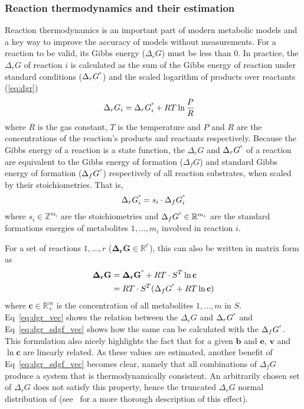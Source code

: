 \documentclass[10pt,letterpaper]{article}
\newcommand{\dgf}{\Delta_fG}
\newcommand{\sdgf}{\Delta_fG^{\degree}}
\newcommand{\dgr}{\Delta_rG}
\newcommand{\sdgr}{\Delta_rG^{\degree}}
\newcommand{\bdgr}{\mathbf{\dgr}}
\newcommand{\bsdgr}{\mathbf{\sdgr}}
\newcommand{\be}{\mathbf{e}}
\newcommand{\bb}{\mathbf{b}}
\newcommand{\bv}{\mathbf{v}}
\begin{document}
\subsubsection{Reaction thermodynamics and their estimation}
Reaction thermodynamics is an important part of modern metabolic models and a key way to improve the accuracy of models without measurements.
For a reaction to be valid, its Gibbs energy ($\dgr$) must be less than 0.
In practice, the $\dgr$ of reaction $i$ is calculated as the sum of the Gibbs energy of reaction under standard conditions ($\sdgr$) and the scaled logarithm of products over reactants (\ref{eq:dgr})
\begin{align}
    \dgr_i &= \sdgr_i + RT\ln \frac{P}{R} \label{eq:dgr}
\end{align}
where $R$ is the gas constant, $T$ is the temperature and $P$ and $R$ are the concentrations of the reaction's products and reactants respectively.
Because the Gibbs energy of a reaction is a state function, the $\dgr$ and $\sdgr$ of a reaction are equivalent to the Gibbs energy of formation ($\dgf$) and standard Gibbs energy of formation ($\sdgf$) respectively of all reaction substrates, when scaled by their stoichiometries.
That is,
\[
    \sdgr_i = s_i \cdot \sdgf_i
\]
where $s_i \in \mathbb{Z}^{m_i}$ are the stoichiometries and $\sdgf \in \mathbb{R}^{m_i}$ are the standard formations energies of metabolites $1,\dots,m_i$ involved in reaction $i$.

For a set of reactions $1,\dots,r$ ($\bdgr \in \mathbb{R^r}$), this can also be written in matrix form as
\begin{align}
        \bdgr &= \bsdgr + RT \cdot S^{T}\ln{\mathbf{c}} \label{eq:dgr_vec}\\
              &= RT \cdot S^T (\sdgf + RT \ln{\mathbf{c}}) \label{eq:dgr_sdgf_vec}
\end{align}
where $\mathbf{c} \in \mathbb{R}_{+}^m$ is the concentration of all metabolites $1,\dots,m$ in $S$.
Eq~\ref{eq:dgr_vec} shows the relation between the $\dgr$ and $\sdgr$ and Eq~\ref{eq:dgr_sdgf_vec} shows how the same can be calculated with the $\sdgf$.
This formulation also nicely highlights the fact that for a given $\bb$ and $\be$, $\bv$ and $\ln{\mathbf{c}}$ are linearly related.
As these values are estimated, another benefit of Eq~\ref{eq:dgr_sdgf_vec} becomes clear, namely that all combinations of $\dgf$ produce a system that is thermodynamically consistent.
An arbitrarily chosen set of $\dgr$ does not satisfy this property, hence the truncated $\dgr$ normal distribution of \cite{PTA} (see~\cite{noor_2013_equilibrator} for a more thorough description of this effect).
\end{document}
